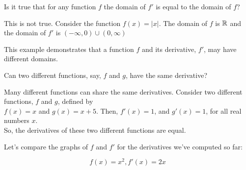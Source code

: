 \documentclass{ximera}
\begin{document}
\begin{question}
  Is it true that for any function $f$ the domain of $f'$ is equal to the domain of $f$?
  \begin{prompt}
  \begin{multipleChoice}
  \end{multipleChoice}
  \begin{feedback}
  This is not true. 
  Consider the function $f(x)=|x|$. 
The domain of $f$ is $\mathbb R$ and the domain of $f'$ is $(-\infty,0)\cup(0,\infty)$


This example demonstrates that a function $f$ and its derivative, $f'$, may have different domains.
  \end{feedback}
  \end{prompt}
\end{question}

\begin{question}
  Can two different functions, say, $f$ and $g$, have the same derivative?
  \begin{prompt}
  \begin{multipleChoice}
  \end{multipleChoice}
  \begin{feedback}
    Many different functions can share the same derivatives.
    Consider two different functions, $f$ and $g$, defined by\\
    $f(x)=x$ and $g(x)=x+5$.
    Then, $f'(x)=1$, and $g'(x)=1$, for all real numbers $x$.\\
    So,  the derivatives of these two different functions are equal.

  \end{feedback}
  \end{prompt}
\end{question}

Let's compare the graphs of $f$ and $f'$ for the derivatives we've computed so far:

$$f(x)=x^2, f'(x)=2x$$
\begin{image}
  \end{image}
\end{document}
